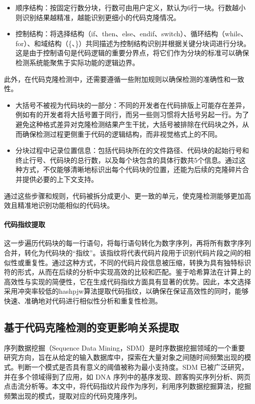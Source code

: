 \begin{itemize}
    \item 顺序结构：按固定行数分块，行数可由用户定义，默认为6行一块。行数越小则识别结果越精准，越能识别更细小的代码克隆情况。
    
    \item 控制结构：将选择结构（if、then、else、endif、switch）、循环结构（while、for）、和域结构（\{、\}）共同描述为控制结构识别并根据关键分块词进行分块。这是由于控制语句是代码逻辑的重要分界点，将它们作为分块的标准可以确保检测系统能聚焦于实际功能的逻辑边界。
\end{itemize}


此外，在代码克隆检测中，还需要遵循一些附加规则以确保检测的准确性和一致性。
\begin{itemize}
    \item 大括号不被视为代码块的一部分：不同的开发者在代码排版上可能存在差异，例如有的开发者将大括号置于同行，而另一些则习惯将大括号另起一行。为了避免这种格式差异对克隆检测结果产生干扰，大括号被排除在代码块之外，从而确保检测过程更侧重于代码的逻辑结构，而非视觉格式上的不同。
    
    \item 分块过程中记录位置信息：包括代码块所在的文件路径、代码块的起始行号和终止行号、代码块的总行数，以及每个块包含的具体行数共5个信息。通过这种方式，不仅能够清晰地标识出每个代码块的位置，还能为后续的克隆碎片合并提供必要的上下文支持。
\end{itemize}

通过这些步骤和规则，代码被拆分成更小、更一致的单元，使克隆检测能够更加高效且精准地识别功能相似的代码块。


\paragraph{代码指纹提取}

这一步遍历代码块的每一行语句，将每行语句转化为数字序列，再将所有数字序列合并，转化为代码块的“指纹”。该指纹将代表代码片段用于识别代码片段之间的相似性或重复性。通过这种方式，不同的代码片段信息被压缩，转换为具有独特标识符的形式，从而在后续的分析中实现高效的比较和匹配。鉴于哈希算法在计算上的高效性与实现的简便性，它在生成代码指纹方面具有显著的优势。因此，本文选择采用冲突率较低的hashpjw算法提取代码指纹，以确保在保证高效性的同时，能够快速、准确地对代码进行相似性分析和重复性检测。


\subsection{基于代码克隆检测的变更影响关系提取}
序列数据挖掘（Sequence Data Mining，SDM）是时序数据挖掘领域的一个重要研究方向，旨在从给定的输入数据库中，探索在大量对象之间随时间频繁出现的模式。判断一个模式是否具有意义的阈值被称为最小支持度。SDM 已被广泛研究，并在多个领域得到了应用，如 DNA 序列中的基序发现、顾客购买序列分析、网页点击流分析等。本文中，将代码指纹片段作为序列，利用序列数据挖掘算法，挖掘频繁出现的模式，提取对应的代码克隆序列。

